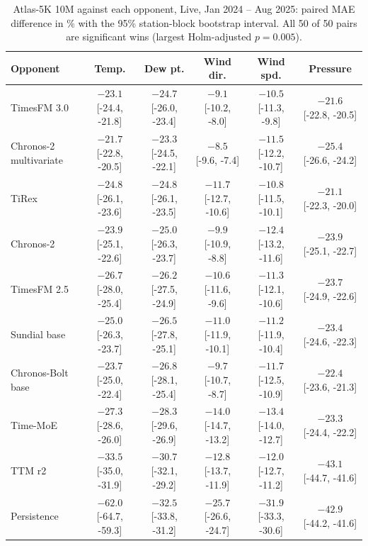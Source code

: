 \begin{table}[H]
\centering\scriptsize
\setlength{\tabcolsep}{2.4pt}
\caption{Atlas-5K 10M against each opponent, Live, Jan 2024 -- Aug 2025: paired MAE difference in \% with the 95\% station-block bootstrap interval. All 50 of 50 pairs are significant wins (largest Holm-adjusted $p=0.005$).}
\label{tab:paired_atlas10m_live}
\begin{tabular}{lccccc}
\toprule
Opponent & Temp. & Dew pt. & Wind dir. & Wind spd. & Pressure\\
\midrule
TimesFM 3.0 & $-23.1$ [-24.4, -21.8] & $-24.7$ [-26.0, -23.4] & $-9.1$ [-10.2, -8.0] & $-10.5$ [-11.3, -9.8] & $-21.6$ [-22.8, -20.5]\\
Chronos-2 multivariate & $-21.7$ [-22.8, -20.5] & $-23.3$ [-24.5, -22.1] & $-8.5$ [-9.6, -7.4] & $-11.5$ [-12.2, -10.7] & $-25.4$ [-26.6, -24.2]\\
TiRex & $-24.8$ [-26.1, -23.6] & $-24.8$ [-26.1, -23.5] & $-11.7$ [-12.7, -10.6] & $-10.8$ [-11.5, -10.1] & $-21.1$ [-22.3, -20.0]\\
Chronos-2 & $-23.9$ [-25.1, -22.6] & $-25.0$ [-26.3, -23.7] & $-9.9$ [-10.9, -8.8] & $-12.4$ [-13.2, -11.6] & $-23.9$ [-25.1, -22.7]\\
TimesFM 2.5 & $-26.7$ [-28.0, -25.4] & $-26.2$ [-27.5, -24.9] & $-10.6$ [-11.6, -9.6] & $-11.3$ [-12.1, -10.6] & $-23.7$ [-24.9, -22.6]\\
Sundial base & $-25.0$ [-26.3, -23.7] & $-26.5$ [-27.8, -25.1] & $-11.0$ [-11.9, -10.1] & $-11.2$ [-11.9, -10.4] & $-23.4$ [-24.6, -22.3]\\
Chronos-Bolt base & $-23.7$ [-25.0, -22.4] & $-26.8$ [-28.1, -25.4] & $-9.7$ [-10.7, -8.7] & $-11.7$ [-12.5, -10.9] & $-22.4$ [-23.6, -21.3]\\
Time-MoE & $-27.3$ [-28.6, -26.0] & $-28.3$ [-29.6, -26.9] & $-14.0$ [-14.7, -13.2] & $-13.4$ [-14.0, -12.7] & $-23.3$ [-24.4, -22.2]\\
TTM r2 & $-33.5$ [-35.0, -31.9] & $-30.7$ [-32.1, -29.2] & $-12.8$ [-13.7, -11.9] & $-12.0$ [-12.7, -11.2] & $-43.1$ [-44.7, -41.6]\\
Persistence & $-62.0$ [-64.7, -59.3] & $-32.5$ [-33.8, -31.2] & $-25.7$ [-26.6, -24.7] & $-31.9$ [-33.3, -30.6] & $-42.9$ [-44.2, -41.6]\\
\bottomrule
\end{tabular}
\end{table}
